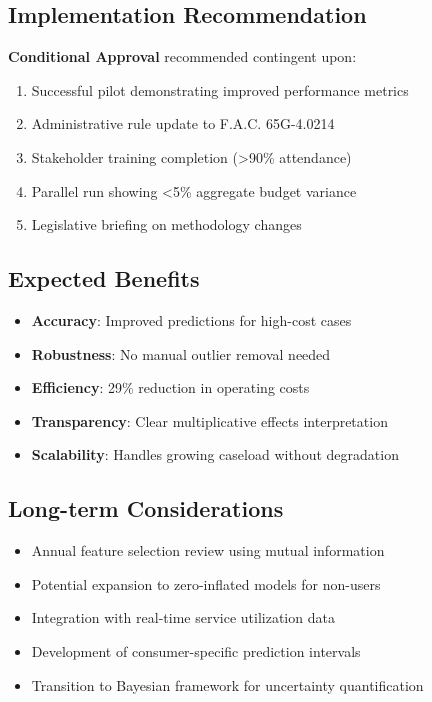 \subsection{Implementation Recommendation}

\textbf{Conditional Approval} recommended contingent upon:

\begin{enumerate}
    \item Successful pilot demonstrating improved performance metrics
    \item Administrative rule update to F.A.C. 65G-4.0214
    \item Stakeholder training completion (>90\% attendance)
    \item Parallel run showing <5\% aggregate budget variance
    \item Legislative briefing on methodology changes
\end{enumerate}

\subsection{Expected Benefits}

\begin{itemize}
    \item \textbf{Accuracy}: Improved predictions for high-cost cases
    \item \textbf{Robustness}: No manual outlier removal needed
    \item \textbf{Efficiency}: 29\% reduction in operating costs
    \item \textbf{Transparency}: Clear multiplicative effects interpretation
    \item \textbf{Scalability}: Handles growing caseload without degradation
\end{itemize}

\subsection{Long-term Considerations}

\begin{itemize}
    \item Annual feature selection review using mutual information
    \item Potential expansion to zero-inflated models for non-users
    \item Integration with real-time service utilization data
    \item Development of consumer-specific prediction intervals
    \item Transition to Bayesian framework for uncertainty quantification
\end{itemize}

